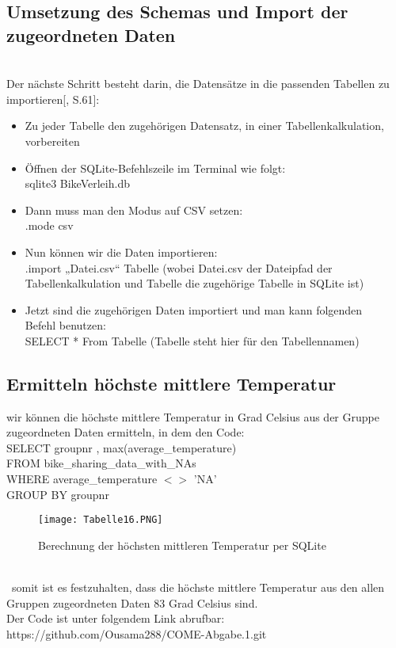 \documentclass[1pt]{article}
\begin{document}
\subsection{Umsetzung des Schemas  und Import der zugeordneten Daten}\\
\label{Umsetzung des Schemas  und Import der zugeordneten Daten}
Der nächste Schritt besteht darin, die Datensätze in die passenden Tabellen zu importieren[\cite{SQLitellll}, S.61]:
\begin{itemize}
\item Zu jeder Tabelle den zugehörigen Datensatz, in einer Tabellenkalkulation, vorbereiten
\item Öffnen der SQLite-Befehlszeile im Terminal wie folgt:\\
sqlite3 BikeVerleih.db
\item Dann muss man den Modus auf CSV setzen:\\
         .mode csv            
\item Nun können wir die Daten importieren:\\
.import „Datei.csv“ Tabelle (wobei Datei.csv der Dateipfad der 
Tabellenkalkulation und Tabelle die zugehörige Tabelle in SQLite ist)

\item Jetzt sind die zugehörigen Daten importiert und man kann folgenden\\ Befehl benutzen:\\
SELECT * From Tabelle (Tabelle steht hier für den Tabellennamen)
\end{itemize}

\newpage
\subsection{Ermitteln höchste mittlere Temperatur}

wir können die höchste mittlere Temperatur in Grad Celsius aus der Gruppe zugeordneten Daten ermitteln, in dem den Code:\\

SELECT groupnr , max(average\_temperature)\\
FROM bike\_sharing\_data\_with\_NAs\\
WHERE average\_temperature $<>$ 'NA'\\
GROUP BY groupnr


\begin{figure}[h] %
    \centering %
    \texttt{[image: Tabelle16.PNG]} %
    \caption{Berechnung der höchsten mittleren Temperatur per SQLite}
   \label{fig:meinBild} %
\end{figure}\\

\ somit ist es festzuhalten, dass die höchste mittlere Temperatur aus den
allen Gruppen zugeordneten Daten  83 Grad Celsius sind.\\

Der Code ist unter folgendem Link abrufbar:\\
    https://github.com/Ousama288/COME-Abgabe.1.git

\printbibliography
\end{document}

